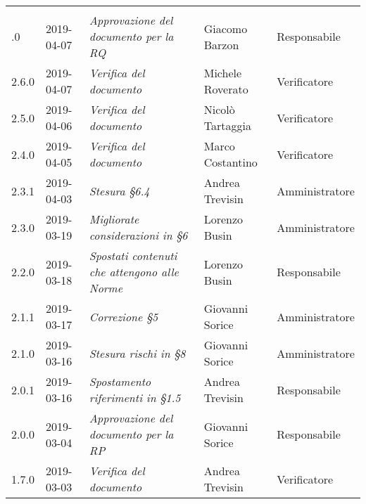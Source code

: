 \newpage
\section*{}
	\begin{longtable}{C{2cm}|C{2.5cm}|C{4.5cm}|C{2.5cm}|C{3cm}}

		 &  &  & &\\
		.0 & 2019-04-07 & \emph{Approvazione del documento per la RQ} & Giacomo Barzon & Responsabile \\
		\hline
		
		2.6.0 & 2019-04-07 & \emph{Verifica del documento} & Michele Roverato & Verificatore \\
		\hline
		
		2.5.0 & 2019-04-06 & \emph{Verifica del documento} & Nicolò Tartaggia & Verificatore \\
		\hline
		
		2.4.0 & 2019-04-05 & \emph{Verifica del documento} & Marco Costantino & Verificatore \\
		\hline
		
		2.3.1 & 2019-04-03 & \emph{Stesura §6.4} & Andrea Trevisin & Amministratore \\
		\hline
		
		2.3.0 & 2019-03-19 & \emph{Migliorate considerazioni in §6} & Lorenzo Busin & Amministratore \\
		\hline
		
		2.2.0 & 2019-03-18 & \emph{Spostati contenuti che attengono alle Norme} & Lorenzo Busin & Responsabile \\
		\hline
		
		2.1.1 & 2019-03-17 & \emph{Correzione §5} & Giovanni Sorice & Amministratore \\
		\hline
		
		2.1.0 & 2019-03-16 & \emph{Stesura rischi in §8} & Giovanni Sorice & Amministratore \\
		\hline
		
		2.0.1 & 2019-03-16 & \emph{Spostamento riferimenti in §1.5} & Andrea Trevisin & Responsabile \\
		\hline		

		2.0.0 & 2019-03-04 & \emph{Approvazione del documento per la RP} & Giovanni Sorice & Responsabile \\
		\hline

		1.7.0 & 2019-03-03 & \emph{Verifica del documento} & Andrea Trevisin & Verificatore \\
		\hline


\end{longtable}
